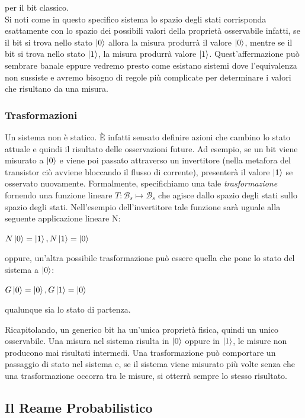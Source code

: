 \documentclass[12pt,a4paper,openright]{report}
\begin{document}
per il bit classico.\\
Si noti come in questo specifico sistema lo spazio degli stati corrisponda esattamente con lo spazio dei possibili valori della proprietà
osservabile infatti, se il bit si trova nello stato $\ket0$ allora la misura produrrà il valore $\ket0$, mentre se il bit si trova nello stato $\ket1$,
la misura produrrà valore $\ket1$. Quest'affermazione può sembrare banale eppure vedremo presto come esistano sistemi dove l'equivalenza 
non sussiste e avremo bisogno di regole più complicate per determinare i valori che risultano da una misura. 

\subsubsection{Trasformazioni}
Un sistema non è statico. È infatti sensato definire azioni che cambino lo stato attuale e quindi il risultato delle osservazioni future. Ad esempio,
se un bit viene misurato a $\ket0$ e viene poi passato attraverso un invertitore (nella metafora del transistor ciò avviene bloccando il flusso di corrente), presenterà il valore $\ket1$ se osservato nuovamente. 
Formalmente, specifichiamo una tale \emph{trasformazione} fornendo una funzione lineare $T:\mathcal{B}_s \mapsto \mathcal{B}_s$ che agisce dallo spazio degli stati sullo spazio degli stati. 
Nell'esempio dell'invertitore tale funzione sarà uguale alla seguente applicazione lineare N:
\begin{center}
    $ N\ket0 = \ket1, N\ket1 = \ket0 $
\end{center}
oppure, un'altra possibile trasformazione può essere quella che pone lo stato del sistema a $\ket0$:
\begin{center}
    $G\ket0 = \ket0,  G\ket1 = \ket0$
\end{center}
qualunque sia lo stato di partenza.
\par
Ricapitolando, un generico bit ha un'unica proprietà fisica, quindi un unico osservabile. Una misura nel sistema risulta in $\ket0$ oppure in $\ket1$, le 
misure non producono mai risultati intermedi. Una trasformazione può comportare un passaggio di stato nel sistema e, se il sistema viene misurato più volte 
 senza che una trasformazione occorra tra le misure, si otterrà sempre lo stesso risultato.

\subsection{Il Reame Probabilistico}
\end{document}
